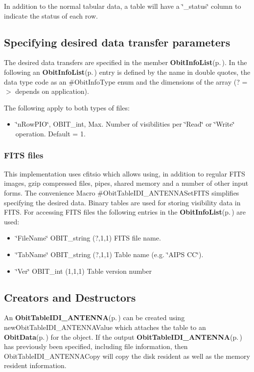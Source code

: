 In addition to the normal tabular data, a table will have a \char`\"{}\_\-status\char`\"{} column to indicate the status of each row.\subsection{Specifying desired data transfer parameters}\label{ObitTableIDI__ANTENNA_8h_ObitTableIDI_ANTENNASpecification}
The desired data transfers are specified in the member {\bf Obit\-Info\-List}{\rm (p.\,\pageref{structObitInfoList})}. In the following an {\bf Obit\-Info\-List}{\rm (p.\,\pageref{structObitInfoList})} entry is defined by the name in double quotes, the data type code as an \#Obit\-Info\-Type enum and the dimensions of the array (? =$>$ depends on application).

The following apply to both types of files: \begin{itemize}
\item \char`\"{}n\-Row\-PIO\char`\"{}, OBIT\_\-int, Max. Number of visibilities per \char`\"{}Read\char`\"{} or \char`\"{}Write\char`\"{} operation. Default = 1.\end{itemize}
\subsubsection{FITS files}\label{ObitTableWX_8h_TableFITS}
This implementation uses cfitsio which allows using, in addition to regular FITS images, gzip compressed files, pipes, shared memory and a number of other input forms. The convenience Macro \#Obit\-Table\-IDI\_\-ANTENNASet\-FITS simplifies specifying the desired data. Binary tables are used for storing visibility data in FITS. For accessing FITS files the following entries in the {\bf Obit\-Info\-List}{\rm (p.\,\pageref{structObitInfoList})} are used: \begin{itemize}
\item \char`\"{}File\-Name\char`\"{} OBIT\_\-string (?,1,1) FITS file name. \item \char`\"{}Tab\-Name\char`\"{} OBIT\_\-string (?,1,1) Table name (e.g. \char`\"{}AIPS CC\char`\"{}). \item \char`\"{}Ver\char`\"{} OBIT\_\-int (1,1,1) Table version number\end{itemize}
\subsection{Creators and Destructors}\label{ObitTableIDI__ANTENNA_8h_ObitTableIDI_ANTENNAaccess}
An {\bf Obit\-Table\-IDI\_\-ANTENNA}{\rm (p.\,\pageref{structObitTableIDI__ANTENNA})} can be created using new\-Obit\-Table\-IDI\_\-ANTENNAValue which attaches the table to an {\bf Obit\-Data}{\rm (p.\,\pageref{structObitData})} for the object. If the output {\bf Obit\-Table\-IDI\_\-ANTENNA}{\rm (p.\,\pageref{structObitTableIDI__ANTENNA})} has previously been specified, including file information, then Obit\-Table\-IDI\_\-ANTENNACopy will copy the disk resident as well as the memory resident information.

